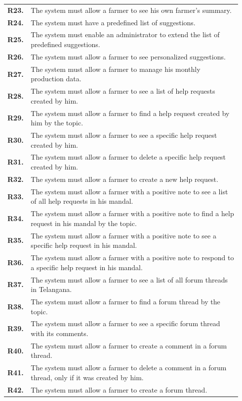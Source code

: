\begin{longtable}{@{}p{0.06\linewidth} p{0.88\linewidth}}
		\textbf{R23.} & The system must allow a farmer to see his own farmer's summary.\\
		\textbf{R24.} & The system must have a predefined list of suggestions. \\
		\textbf{R25.} & The system must enable an administrator to extend the list of predefined suggestions.\\
		\textbf{R26.} & The system must allow a farmer to see personalized suggestions.\\
		\textbf{R27.} & The system must allow a farmer to manage his monthly production data.\\
		\textbf{R28.} & The system must allow a farmer to see a list of help requests created by him.\\
		\textbf{R29.} & The system must allow a farmer to find a help request created by him by the topic.\\
		\textbf{R30.} & The system must allow a farmer to see a specific help request created by him.\\
		\textbf{R31.} & The system must allow a farmer to delete a specific help request created by him.\\
		\textbf{R32.} & The system must allow a farmer to create a new help request.\\
		\textbf{R33.} & The system must allow a farmer with a positive note to see a list of all help requests in his mandal.\\
		\textbf{R34.} & The system must allow a farmer with a positive note to find a help request in his mandal by the topic.\\
		\textbf{R35.} & The system must allow a farmer with a positive note to see a specific help request in his mandal.\\
		\textbf{R36.} & The system must allow a farmer with a positive note to respond to a specific help request in his mandal.\\
		\textbf{R37.} & The system must allow a farmer to see a list of all forum threads in Telangana.\\
		\textbf{R38.} & The system must allow a farmer to find a forum thread by the topic.\\
		\textbf{R39.} & The system must allow a farmer to see a specific forum thread with its comments.\\
		\textbf{R40.} & The system must allow a farmer to create a comment in a forum thread.\\
		\textbf{R41.} & The system must allow a farmer to delete a comment in a forum thread, only if it was created by him.\\
		\textbf{R42.} & The system must allow a farmer to create a forum thread.\\
		

\end{longtable}
